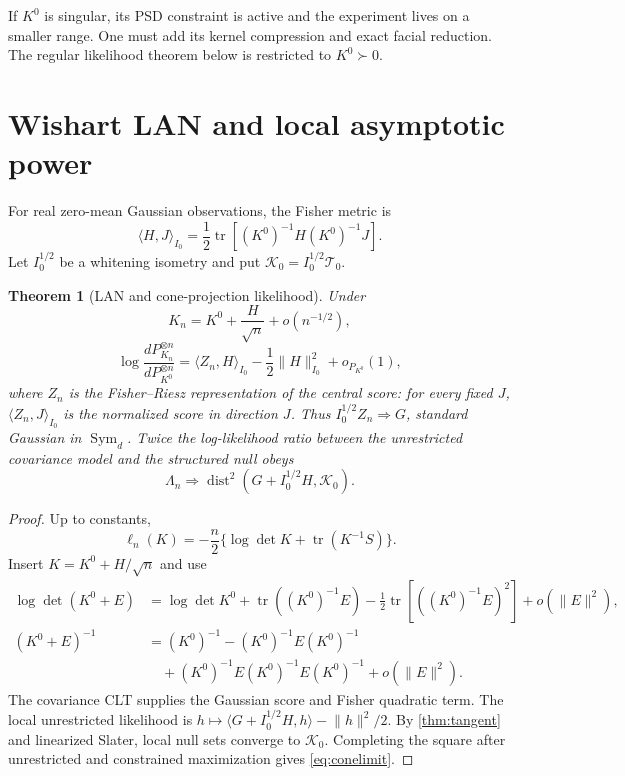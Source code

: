 \documentclass[11pt]{article}
\newtheorem{theorem}{Theorem}[section]
\newcommand{\Sym}{\operatorname{Sym}}
\newcommand{\tr}{\operatorname{tr}}
\newcommand{\dist}{\operatorname{dist}}
\newcommand{\cT}{\mathcal T}
\newcommand{\ip}[2]{\langle #1,#2\rangle}
\newcommand{\norm}[1]{\lVert #1\rVert}
\begin{document}
If $K^0$ is singular, its PSD constraint is active and the experiment lives
on a smaller range.  One must add its kernel compression and exact facial
reduction.  The regular likelihood theorem below is restricted to
$K^0\succ0$.

\section{Wishart LAN and local asymptotic power}

For real zero-mean Gaussian observations, the Fisher metric is
\[
\ip{H}{J}_{I_0}
=\frac12\tr[(K^0)^{-1}H(K^0)^{-1}J].                              \tag{8.1}
\]
Let $I_0^{1/2}$ be a whitening isometry and put
$\mathcal K_0=I_0^{1/2}\cT_0$.

\begin{theorem}[LAN and cone-projection likelihood]\label{thm:lan}
Under
\[
K_n=K^0+\frac{H}{\sqrt n}+o(n^{-1/2}),                             \tag{8.2}
\]
\[
\log\frac{dP_{K_n}^{\otimes n}}{dP_{K^0}^{\otimes n}}
=\ip{Z_n}{H}_{I_0}-\frac12\norm{H}_{I_0}^2+o_{P_{K^0}}(1),         \tag{8.3}
\]
where $Z_n$ is the Fisher--Riesz representation of the central score: for
every fixed $J$, $\ip{Z_n}{J}_{I_0}$ is the normalized score in direction
$J$.  Thus $I_0^{1/2}Z_n\Rightarrow G$, standard Gaussian in $\Sym_d$.
Twice the log-likelihood ratio between the unrestricted covariance model and
the structured null obeys
\[
\boxed{\Lambda_n\Rightarrow
\dist^2(G+I_0^{1/2}H,\mathcal K_0).}                               \tag{8.4}\label{eq:conelimit}
\]
\end{theorem}

\begin{proof}
Up to constants,
\[
\ell_n(K)=-\frac n2\{\log\det K+\tr(K^{-1}S)\}.                    \tag{8.5}
\]
Insert $K=K^0+H/\sqrt n$ and use
\[
\begin{aligned}
\log\det(K^0+E)&=\log\det K^0+\tr((K^0)^{-1}E)
-\tfrac12\tr[((K^0)^{-1}E)^2]+o(\norm E^2),\\
(K^0+E)^{-1}&=(K^0)^{-1}-(K^0)^{-1}E(K^0)^{-1}\\
&\quad +(K^0)^{-1}E(K^0)^{-1}E(K^0)^{-1}+o(\norm E^2).
\end{aligned}                                                       \tag{8.6}
\]
The covariance CLT supplies the Gaussian score and Fisher quadratic term.
The local unrestricted likelihood is
$h\mapsto\ip{G+I_0^{1/2}H}{h}-\norm h^2/2$.  By
\cref{thm:tangent} and linearized Slater, local null sets converge to
$\mathcal K_0$.  Completing the square after unrestricted and constrained
maximization gives \cref{eq:conelimit}.
\end{proof}
\end{document}
